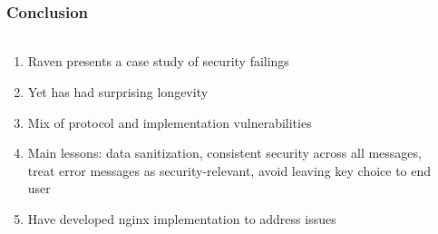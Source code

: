 \documentclass[handout, aspectratio=169, notes=hide]{beamer}
\begin{document}

\begin{frame}
\frametitle{Conclusion}
\framesubtitle{}
\setlength{\parskip}{1.0em}
\begin{columns}[T]
\begin{column}[T]{1.0\textwidth}	
\setlength{\parskip}{1.0em}

\begin{enumerate}
\setlength{\parskip}{1.0em}
\item Raven presents a case study of security failings
\item Yet has had surprising longevity
\item Mix of protocol and implementation vulnerabilities
\item Main lessons: data sanitization, consistent security across all messages, treat error messages as security-relevant, avoid leaving key choice to end user
\item Have developed nginx implementation to address issues
\end{enumerate}
\end{column}

\begin{column}[T]{0.0\textwidth}
\end{column}
\end{columns}

\end{frame}
\note{
}



\end{document}
